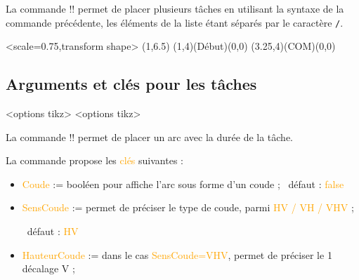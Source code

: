 \documentclass[french,a4paper,11pt]{article}
\newcommand\Cle[1]{{\small\sffamily\textlangle \textcolor{orange}{#1}\textrangle}}
\begin{document}
{{\begin{tipblock}
La commande \motcletex!\MPMPlaceTaches! permet de placer plusieurs tâches en utilisant la syntaxe de la commande précédente, les éléments de la liste étant séparés par le caractère \verb!/!.
\end{tipblock}

\begin{DemoCode}[]
\begin{GrapheMPM}[CouleurDates=green/orange,CouleurBords=brown,Grille={18,8}]%
	<scale=0.75,transform shape>
	\MPMPlaceNotice(1,6.5)
	\MPMPlaceTache(1,4)(Début)(0,0)
	\MPMPlaceTache(3.25,4)(COM)(0,0)
\end{GrapheMPM}
\end{DemoCode}

\pagebreak

\subsection{Arguments et clés pour les tâches}

\begin{DemoCode}
\begin{GrapheMPM}[clés]<options tikz>
	<options tikz>
\end{GrapheMPM}
\end{DemoCode}

\begin{tipblock}
La commande \motcletex!\MPMPlaceDuree! permet de placer un arc avec la durée de la tâche.

\smallskip

La commande propose les \Cle{clés} suivantes :

\begin{itemize}
	\item \Cle{Coude} := booléen pour affiche l'arc sous forme d'un coude ; \hfill~défaut : \Cle{false}
	\item \Cle{SensCoude} := permet de préciser le type de coude, parmi \Cle{HV / VH / VHV} ;
	
	\hfill~défaut : \Cle{HV}
	\item \Cle{HauteurCoude} := dans le cas \Cle{SensCoude=VHV}, permet de préciser le 1\ier{} décalage V ;
	

\end{itemize}
\end{tipblock}}}
\end{document}
